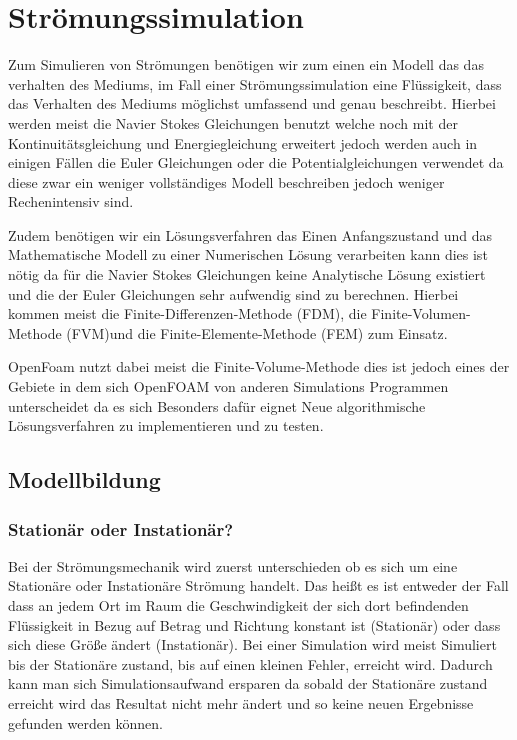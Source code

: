 %
%
%
%
\section{Strömungssimulation
\label{openfoam:section:teil1}}
Zum Simulieren von Strömungen benötigen wir zum einen ein Modell das das verhalten des Mediums, im Fall einer Strömungssimulation eine Flüssigkeit, dass das Verhalten des Mediums möglichst umfassend und genau beschreibt. 
Hierbei werden meist die Navier Stokes Gleichungen benutzt welche noch mit der Kontinuitätsgleichung und Energiegleichung erweitert jedoch werden auch in einigen Fällen die Euler Gleichungen oder die Potentialgleichungen verwendet da diese zwar ein weniger vollständiges Modell beschreiben jedoch weniger Rechenintensiv sind.

Zudem benötigen wir ein Lösungsverfahren das Einen Anfangszustand und das Mathematische Modell zu einer Numerischen Lösung verarbeiten kann dies ist nötig da für die Navier Stokes Gleichungen keine Analytische Lösung existiert und die der Euler Gleichungen sehr aufwendig sind zu berechnen. 
Hierbei kommen meist die Finite-Differenzen-Methode (FDM), die Finite-Volumen-Methode (FVM)und die Finite-Elemente-Methode (FEM) zum Einsatz. 

OpenFoam nutzt dabei meist die Finite-Volume-Methode dies ist jedoch eines der Gebiete in dem sich OpenFOAM von anderen Simulations Programmen unterscheidet da es sich Besonders dafür eignet Neue algorithmische Lösungsverfahren zu implementieren und zu testen.

\subsection{Modellbildung}
\subsubsection{Stationär oder Instationär?}
Bei der Strömungsmechanik wird zuerst unterschieden ob es sich um eine Stationäre oder Instationäre Strömung handelt.
Das heißt es ist entweder der Fall dass an jedem Ort im Raum die Geschwindigkeit der sich dort befindenden Flüssigkeit in Bezug auf Betrag und Richtung konstant ist (Stationär) oder dass sich diese Größe ändert (Instationär).
Bei einer Simulation wird meist Simuliert bis der Stationäre zustand, bis auf einen kleinen Fehler, erreicht wird.
Dadurch kann man sich Simulationsaufwand ersparen da sobald der Stationäre zustand erreicht wird das Resultat nicht mehr ändert und so keine neuen Ergebnisse gefunden werden können.

